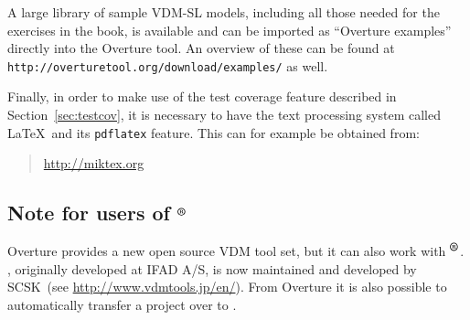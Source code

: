 A large library of sample VDM-SL models, including all those needed for the exercises in the book, is available and can be imported as ``Overture examples'' directly into the Overture tool.  An overview of these can be found at \texttt{http://overturetool.org/download/examples/} as well.

Finally, in order to make use of the test coverage feature described in Section~\ref{sec:testcov}, it is necessary to have the text processing system called \LaTeX\ and its \texttt{pdflatex} feature. This can for example be obtained from:
%
\begin{quote}
\url{http://miktex.org}
\end{quote}
%
\subsection*{Note for users of \vdmtools$^{\mbox{\small\textbf{{\textregistered}}}}$}
Overture provides a new open source VDM tool set, but it can also work with \vdmtools$^{\mbox{\small\textbf{{\textregistered}}}}$. \vdmtools, originally developed at IFAD A/S, is now maintained and developed by SCSK~(see \url{http://www.vdmtools.jp/en/}). From Overture it is also possible to automatically transfer a project over to \vdmtools.
%

